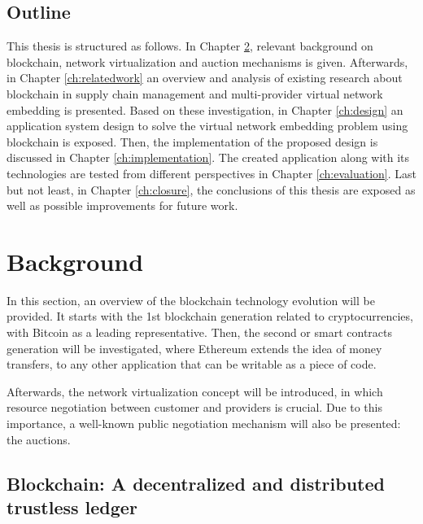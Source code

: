 \section{Outline}

This thesis is structured as follows. In Chapter \ref{ch:background}, relevant background on blockchain, network virtualization and auction mechanisms is given. Afterwards, in Chapter \ref{ch:relatedwork} an overview and analysis of existing research about blockchain in supply chain management and multi-provider virtual network embedding is presented. Based on these investigation, in Chapter \ref{ch:design} an application system design to solve the virtual network embedding problem using blockchain is exposed. Then, the implementation of the proposed design is discussed in Chapter \ref{ch:implementation}. The created application along with its technologies are tested from different perspectives in Chapter \ref{ch:evaluation}. Last but not least, in Chapter \ref{ch:closure}, the conclusions of this thesis are exposed as well as possible improvements for future work.


\chapter{Background}
\label{ch:background}

In this section, an overview of the blockchain technology evolution will be provided. It starts with the 1st blockchain generation related to cryptocurrencies, with Bitcoin as a leading representative. Then, the second or smart contracts generation will be investigated, where Ethereum extends the idea of money transfers, to any other application that can be writable as a piece of code.

Afterwards, the network virtualization concept will be introduced, in which resource negotiation between customer and providers is crucial. Due to this importance, a well-known public negotiation mechanism will also be presented: the auctions.

\section{Blockchain: A decentralized and distributed trustless ledger}


